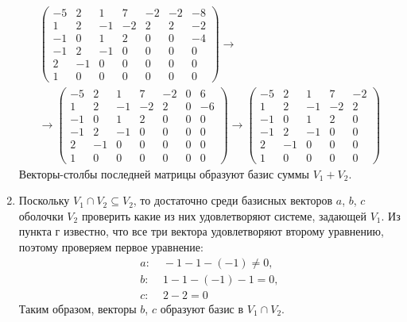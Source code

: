 \documentclass[12pt]{article}
\begin{document}
\begin{enumerate}
\begin{gather*}
\begin{pmatrix}
                -5 & 2  & 1  & 7  & -2 & -2 & -8 \\
                1  & 2  & -1 & -2 & 2  & 2  & -2 \\
                -1 & 0  & 1  & 2  & 0  & 0  & -4 \\
                -1 & 2  & -1 & 0  & 0  & 0  & 0  \\
                2  & -1 & 0  & 0  & 0  & 0  & 0  \\
                1  & 0  & 0  & 0  & 0  & 0  & 0
            \end{pmatrix}
            \rightarrow \\
            \rightarrow
            \begin{pmatrix}
                -5 & 2  & 1  & 7  & -2 & 0 & 6  \\
                1  & 2  & -1 & -2 & 2  & 0 & -6 \\
                -1 & 0  & 1  & 2  & 0  & 0 & 0  \\
                -1 & 2  & -1 & 0  & 0  & 0 & 0  \\
                2  & -1 & 0  & 0  & 0  & 0 & 0  \\
                1  & 0  & 0  & 0  & 0  & 0 & 0
            \end{pmatrix}
            \rightarrow
            \begin{pmatrix}
                -5 & 2  & 1  & 7  & -2 \\
                1  & 2  & -1 & -2 & 2  \\
                -1 & 0  & 1  & 2  & 0  \\
                -1 & 2  & -1 & 0  & 0  \\
                2  & -1 & 0  & 0  & 0  \\
                1  & 0  & 0  & 0  & 0
            \end{pmatrix}
        \end{gather*}
        Векторы-столбы последней матрицы образуют базис суммы $V_1 + V_2$.

        \item Поскольку $V_1 \cap V_2 \subseteq V_2$, то достаточно среди базисных векторов $a$, $b$, $c$ оболочки $V_2$ проверить какие из них удовлетворяют системе, задающей $V_1$.
        Из пункта г известно, что все три вектора удовлетворяют второму уравнению, поэтому проверяем первое уравнение:
        \begin{align*}
            a: & \; -1 - 1 - (-1) \neq 0 , \\
            b: & \; 1 -1 - (-1) - 1 = 0 , \\
            c: & \; 2 - 2 = 0
        \end{align*}
        Таким образом, векторы $b$, $c$ образуют базис в $V_1 \cap V_2$.
    \end{enumerate}
\end{document}
